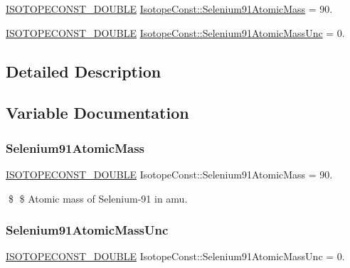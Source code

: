 \begin{DoxyCompactItemize}
\item 
\mbox{\hyperlink{group___isotope_const-_macros_ga8f45a7272ce02c0b4c65c44636ed719a}{I\+S\+O\+T\+O\+P\+E\+C\+O\+N\+S\+T\+\_\+\+D\+O\+U\+B\+LE}} \mbox{\hyperlink{group___isotope_const-_selenium-_se91_gaaa2defda284f2a7ecd30a13e5ca57c65}{Isotope\+Const\+::\+Selenium91\+Atomic\+Mass}} = 90.
\item 
\mbox{\hyperlink{group___isotope_const-_macros_ga8f45a7272ce02c0b4c65c44636ed719a}{I\+S\+O\+T\+O\+P\+E\+C\+O\+N\+S\+T\+\_\+\+D\+O\+U\+B\+LE}} \mbox{\hyperlink{group___isotope_const-_selenium-_se91_gaeb2486d23ce2a5bad403d3bd6c777b9e}{Isotope\+Const\+::\+Selenium91\+Atomic\+Mass\+Unc}} = 0.
\end{DoxyCompactItemize}


\subsection{Detailed Description}


\subsection{Variable Documentation}
\mbox{\label{group___isotope_const-_selenium-_se91_gaaa2defda284f2a7ecd30a13e5ca57c65}} 
\subsubsection{\texorpdfstring{Selenium91\+Atomic\+Mass}{Selenium91AtomicMass}}
{\footnotesize\ttfamily \mbox{\hyperlink{group___isotope_const-_macros_ga8f45a7272ce02c0b4c65c44636ed719a}{I\+S\+O\+T\+O\+P\+E\+C\+O\+N\+S\+T\+\_\+\+D\+O\+U\+B\+LE}} Isotope\+Const\+::\+Selenium91\+Atomic\+Mass = 90.}

\$ \$ Atomic mass of Selenium-\/91 in amu. \mbox{\label{group___isotope_const-_selenium-_se91_gaeb2486d23ce2a5bad403d3bd6c777b9e}} 
\subsubsection{\texorpdfstring{Selenium91\+Atomic\+Mass\+Unc}{Selenium91AtomicMassUnc}}
{\footnotesize\ttfamily \mbox{\hyperlink{group___isotope_const-_macros_ga8f45a7272ce02c0b4c65c44636ed719a}{I\+S\+O\+T\+O\+P\+E\+C\+O\+N\+S\+T\+\_\+\+D\+O\+U\+B\+LE}} Isotope\+Const\+::\+Selenium91\+Atomic\+Mass\+Unc = 0.}

